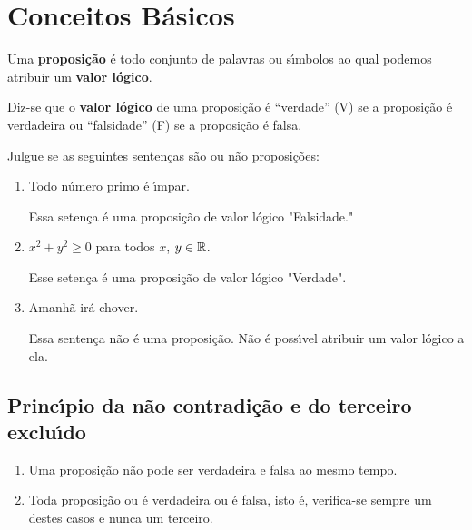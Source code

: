 \chapter{Conceitos B\'asicos} %
\label{cha:conceitos_basicos}

\begin{definicao}
    Uma \textbf{proposi\c{c}\~ao} \'e todo conjunto de palavras ou s{\'\i}mbolos ao qual podemos atribuir um \textbf{valor l\'ogico}.
\end{definicao}

\begin{definicao}
    Diz-se que o \textbf{valor l\'ogico} de uma proposi\c{c}\~ao \'e ``verdade'' (V) se a proposi\c{c}\~ao \'e verdadeira ou ``falsidade'' (F) se a proposi\c{c}\~ao \'e falsa.
\end{definicao}

\begin{exemplos}
    Julgue se as seguintes senten\c{c}as s\~ao ou n\~ao proposi\c{c}\~oes:
    \begin{enumerate}[label={\arabic*})]
        \item Todo n\'umero primo \'e {\'\i}mpar.
        \begin{solucao}
            Essa seten\c{c}a \'e uma proposi\c{c}\~ao de valor l\'ogico "Falsidade."
        \end{solucao}

        \item $x^2 + y^2 \ge 0$ para todos $x$, $y \in \mathbb{R}$.
        \begin{solucao}
            Esse seten\c{c}a \'e uma proposi\c{c}\~ao de valor l\'ogico "Verdade".
        \end{solucao}

        \item Amanh\~a ir\'a chover.
        \begin{solucao}
            Essa senten\c{c}a n\~ao \'e uma proposi\c{c}\~ao. N\~ao \'e poss{\'\i}vel atribuir um valor l\'ogico a ela.
        \end{solucao}
    \end{enumerate}

\end{exemplos}

\section{Princ{\'\i}pio da n\~ao contradi\c{c}\~ao e do terceiro exclu{\'\i}do} %
\label{sec:principio_da_nao_contradicao_e_do_3}
\begin{enumerate}[label={\roman*})]
    \item Uma proposi\c{c}\~ao n\~ao pode ser verdadeira e falsa ao mesmo tempo.
    \item Toda proposi\c{c}\~ao ou \'e verdadeira ou \'e falsa, isto \'e, verifica-se sempre um destes casos e nunca um terceiro.
\end{enumerate}

